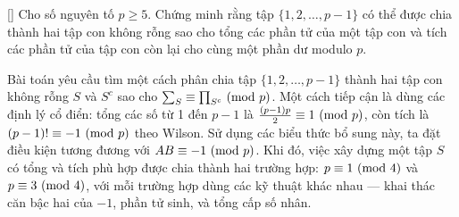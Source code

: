 \documentclass[../01-divisibility.tex]{subfiles}
\begin{document}
\begin{example*}\label{example:RUS-2015-TST-D10-P2}[\textbf{}]
	Cho số nguyên tố \( p \ge 5 \). Chứng minh rằng tập \( \{1,2,\ldots,p - 1\} \) có thể được chia thành hai tập con không rỗng
	sao cho tổng các phần tử của một tập con và tích các phần tử của tập con còn lại cho cùng một phần dư modulo \( p \).	
\end{example*}

\begin{story*}
    Bài toán yêu cầu tìm một cách phân chia tập \( \{1, 2, \dots, p-1\} \) thành hai tập con không rỗng \( S \) và \( S^c \) sao cho \( \sum_{S} \equiv \prod_{S^c} \ (\mathrm{mod}\ p) \). Một cách tiếp cận là dùng các định lý cổ điển: tổng các số từ 1 đến \( p-1 \) là \( \frac{(p-1)p}{2} \equiv 1 \ (\mathrm{mod}\ p) \), còn tích là \( (p-1)! \equiv -1 \ (\mathrm{mod}\ p) \) theo Wilson. Sử dụng các biểu thức bổ sung này, ta đặt điều kiện tương đương với \( AB \equiv -1 \ (\mathrm{mod}\ p) \). Khi đó, việc xây dựng một tập \( S \) có tổng và tích phù hợp được chia thành hai trường hợp: \( p \equiv 1 \ (\mathrm{mod}\ 4) \) và \( p \equiv 3 \ (\mathrm{mod}\ 4) \), với mỗi trường hợp dùng các kỹ thuật khác nhau — khai thác căn bậc hai của \( -1 \), phần tử sinh, và tổng cấp số nhân.
\end{story*}
\end{document}
